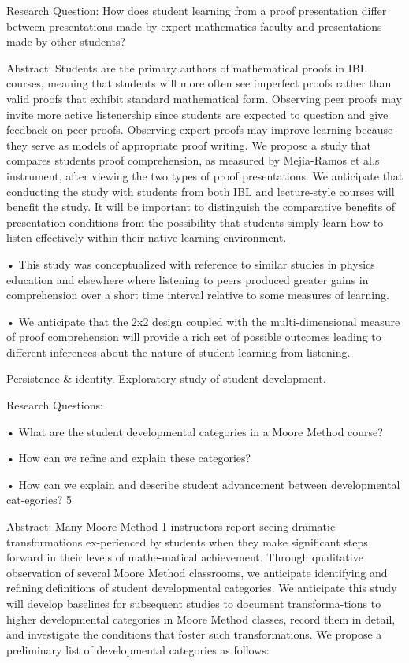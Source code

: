 \documentclass[11pt]{article}
\begin{document}
Research Question: How does student learning from a proof presentation differ between presentations made by expert mathematics faculty and presentations made by other students?

Abstract: Students are the primary authors of mathematical proofs in IBL courses, meaning that students will more often see imperfect proofs rather than valid proofs that exhibit standard mathematical form. Observing peer proofs may invite more active listenership since students are expected to question and give feedback on peer proofs. Observing expert proofs may improve learning because they serve as models of appropriate proof writing. We propose a study that compares students proof comprehension, as measured by Mejia-Ramos et al.s instrument, after viewing the two types of proof presentations. We anticipate that conducting the study with students from both IBL and lecture-style courses will benefit the study. It will be important to distinguish the comparative benefits of presentation conditions from the possibility that students simply learn how to listen effectively within their native learning environment.

• This study was conceptualized with reference to similar studies in physics education and elsewhere where listening to peers produced greater gains in comprehension over a short time interval relative to some measures of learning.

• We anticipate that the 2x2 design coupled with the multi-dimensional measure of proof comprehension will provide a rich set of possible outcomes leading to different inferences about the nature of student learning from listening.

Persistence \& identity. Exploratory study of student development.

Research Questions:

• What are the student developmental categories in a Moore Method course?

• How can we refine and explain these categories?

• How can we explain and describe student advancement between developmental cat-egories? 5

Abstract: Many Moore Method 1 instructors report seeing dramatic transformations ex-perienced by students when they make significant steps forward in their levels of mathe-matical achievement. Through qualitative observation of several Moore Method classrooms, we anticipate identifying and refining definitions of student developmental categories. We anticipate this study will develop baselines for subsequent studies to document transforma-tions to higher developmental categories in Moore Method classes, record them in detail, and investigate the conditions that foster such transformations. We propose a preliminary list of developmental categories as follows:
\end{document}
